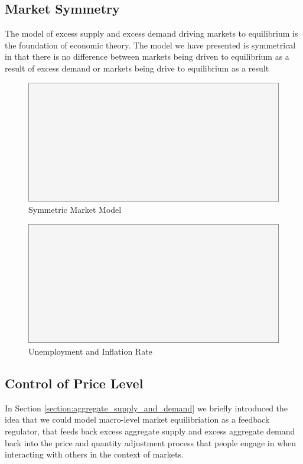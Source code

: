 \subsection{Market Symmetry}

The model of excess supply and excess demand driving markets to equilibrium is the foundation of
economic theory. The model we have presented is symmetrical in that there is no difference between
markets being driven to equilibrium as a result of excess demand or markets being drive to
equilibrium as a result  

\begin{figure}[H]
\centering
\includegraphics[scale=0.48]{blank}
\caption{Symmetric Market Model}
\label{fig:symmetric_market_model}
\end{figure}

\begin{figure}[H]
\centering
\includegraphics[scale=0.48]{blank}
\caption{Unemployment and Inflation Rate}
\label{fig:ui_summary}
\end{figure}

\subsection{Control of Price Level}

In Section \ref{section:aggregate_supply_and_demand} we briefly introduced the idea that we could model
macro-level market equilibriation as a feedback regulator, that feeds back excess aggregate supply
and excess aggregate demand back into the price and quantity adjustment process that people engage
in when interacting with others in the context of markets. 

